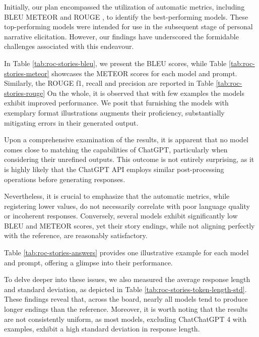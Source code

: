 Initially, our plan encompassed the utilization of automatic metrics, including BLEU \cite{bleu} METEOR \cite{meteor} and ROUGE \cite{rouge}, to identify the best-performing models. These top-performing models were intended for use in the subsequent stage of personal narrative elicitation. However, our findings have underscored the formidable challenges associated with this endeavour.



In Table \ref{tab:roc-stories-bleu}, we present the BLEU scores, while Table \ref{tab:roc-stories-meteor} showcases the METEOR scores for each model and prompt. Similarly, the ROUGE f1, recall and precision are reported in Table \ref{tab:roc-stories-rouge} On the whole, it is observed that with few examples the models exhibit improved performance. We posit that furnishing the models with exemplary format illustrations augments their proficiency, substantially mitigating errors in their generated output.

Upon a comprehensive examination of the results, it is apparent that no model comes close to matching the capabilities of ChatGPT, particularly when considering their unrefined outputs. This outcome is not entirely surprising, as it is highly likely that the ChatGPT API employs similar post-processing operations before generating responses.

Nevertheless, it is crucial to emphasize that the automatic metrics, while registering lower values, do not necessarily correlate with poor language quality or incoherent responses. Conversely, several models exhibit significantly low BLEU and METEOR scores, yet their story endings, while not aligning perfectly with the reference, are reasonably satisfactory.

Table \ref{tab:roc-stories-answers} provides one illustrative example for each model and prompt, offering a glimpse into their performance.

% 
To delve deeper into these issues, we also measured the average response length and standard deviation, as depicted in Table \ref{tab:roc-stories-token-length-std}. These findings reveal that, across the board, nearly all models tend to produce longer endings than the reference. Moreover, it is worth noting that the results are not consistently uniform, as most models, excluding ChatChatGPT 4 with examples, exhibit a high standard deviation in response length.


